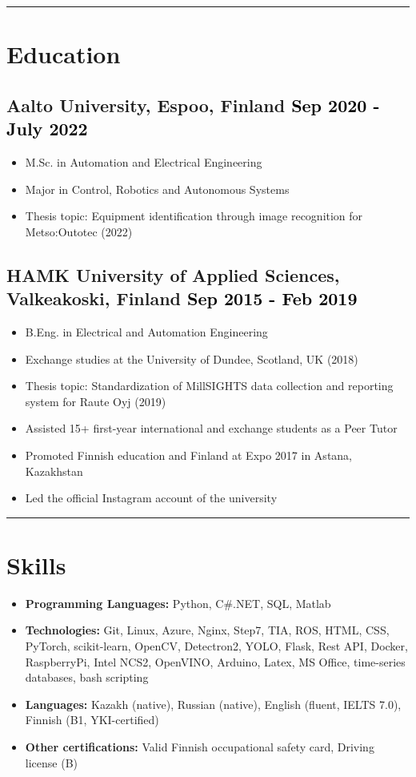 \documentclass[a4paper,10pt]{article}
\begin{document}
\vspace{0.2cm}
\hrule
\vspace{0.3cm}

\section*{Education}
\subsection*{Aalto University, Espoo, Finland \hfill \textcolor{black}{Sep 2020 - July 2022}}
\begin{itemize}
    \item M.Sc. in Automation and Electrical Engineering
    \item Major in Control, Robotics and Autonomous Systems
    \item Thesis topic: Equipment identification through image recognition for Metso:Outotec (2022)
\end{itemize}

\subsection*{HAMK University of Applied Sciences, Valkeakoski, Finland \hfill \textcolor{black}{Sep 2015 - Feb 2019}}
\begin{itemize}
    \item B.Eng. in Electrical and Automation Engineering
    \item Exchange studies at the University of Dundee, Scotland, UK (2018)
    \item Thesis topic: Standardization of MillSIGHTS data collection and reporting system for Raute Oyj (2019)
    \item Assisted 15+ first-year international and exchange students as a Peer Tutor
    \item Promoted Finnish education and Finland at Expo 2017 in Astana, Kazakhstan
    \item Led the official Instagram account of the university
\end{itemize}

\vspace{0.2cm}
\hrule
\vspace{0.3cm}

\section*{Skills}
\begin{itemize}
    \item \textbf{Programming Languages:} Python, C\#.NET, SQL, Matlab
    \item \textbf{Technologies:} Git, Linux, Azure, Nginx, Step7, TIA, ROS, HTML, CSS, PyTorch, scikit-learn, OpenCV, Detectron2, YOLO, Flask, Rest API, Docker, RaspberryPi, Intel NCS2, OpenVINO, Arduino, Latex, MS Office, time-series databases, bash scripting
    \item \textbf{Languages:} Kazakh (native), Russian (native), English (fluent, IELTS 7.0), Finnish (B1, YKI-certified)
    \item \textbf{Other certifications:} Valid Finnish occupational safety card, Driving license (B)
\end{itemize}
\end{document}
